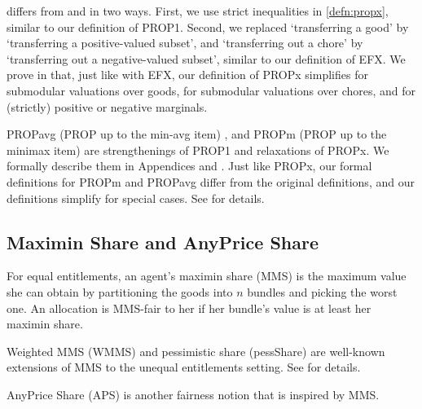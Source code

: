  differs from \citet{aziz2020polynomial} and \citet{li2022almost} in two ways.
First, we use strict inequalities in \cref{defn:propx}, similar to our definition of PROP1.
Second, we replaced `transferring a good' by `transferring a positive-valued subset',
and `transferring out a chore' by `transferring out a negative-valued subset',
similar to our definition of EFX. We prove in  that,
just like with EFX, our definition of PROPx simplifies for submodular valuations over goods,
for submodular valuations over chores, and for (strictly) positive or negative marginals.

PROPavg (PROP up to the min-avg item) \citep{kobayashi2025proportional},
and PROPm (PROP up to the minimax item) \citep{baklanov2021achieving}
are strengthenings of PROP1 and relaxations of PROPx.
We formally describe them in Appendices  and .
Just like PROPx, our formal definitions for PROPm and PROPavg differ from the original definitions,
and our definitions simplify for special cases. See  for details.

\subsection{Maximin Share and AnyPrice Share}

For equal entitlements, an agent's maximin share (MMS) \citep{budish2011combinatorial}
is the maximum value she can obtain by partitioning the goods into $n$ bundles and picking the worst one.
An allocation is MMS-fair to her if her bundle's value is at least her maximin share.


Weighted MMS (WMMS) \citep{farhadi2019fair} and pessimistic share (pessShare) \citep{babaioff2023fair}
are well-known extensions of MMS to the unequal entitlements setting.
See  for details.

AnyPrice Share (APS) \citep{babaioff2023fair} is another fairness notion that is inspired by MMS.

